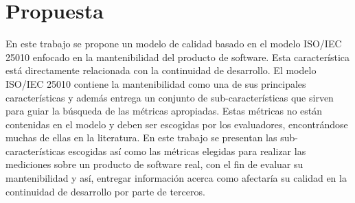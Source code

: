 
\chapter{Propuesta}
En este trabajo se propone un modelo de calidad basado en el modelo ISO/IEC 25010
enfocado en la mantenibilidad del producto de software. Esta característica está
directamente relacionada con la continuidad de desarrollo.
El modelo ISO/IEC 25010 contiene la mantenibilidad como una de sus principales
características y además entrega un conjunto de sub-características que sirven para
guiar la búsqueda de las métricas apropiadas.
Estas métricas no están contenidas en el modelo y deben ser escogidas por los evaluadores, 
encontrándose muchas de ellas en la literatura.
En este trabajo se presentan las sub-características escogidas así como las 
métricas elegidas para realizar las mediciones sobre un producto de software real, 
con el fin de evaluar su mantenibilidad y así, entregar información acerca como afectaría
su calidad en la continuidad de desarrollo por parte de terceros.
